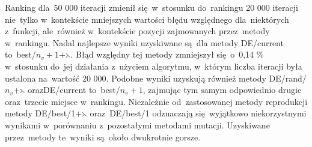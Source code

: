 \begin{itemize}
\begin{table}[h!]
\begin{center}
\caption{Ranking metod mutacji na podstawie średniej wartości błędu względnego funkcji celu, metoda rankingowa, 50 000 iteracji.}
\label{ranking4}
\end{center}
\end{table}

Ranking dla~50 000 iteracji zmienił się~w~stosunku do~rankingu 20 000 iteracji nie~tylko w~kontekście mniejszych wartości błędu względnego dla~niektórych z~funkcji, ale~również w~kontekście pozycji zajmowanych przez~metody w~rankingu. Nadal najlepsze wyniki uzyskiwane są~dla metody DE/current to~best/$n_{v}+1$+$\leftthreetimes$. Błąd względny tej metody zmniejszył się~o~0,14 \% w~stosunku do~jej działania z~użyciem algorytmu, w~którym liczba iteracji była ustalona na~wartość 20 000. Podobne wyniki uzyskują również metody DE/rand/$n_{v}$+$\leftthreetimes$ orazDE/current to~best/$n_{v}+1$, zajmując tym samym odpowiednio drugie oraz~trzecie miejsce w~rankingu. Niezależnie od~zastosowanej metody reprodukcji metody DE/best/1+$\leftthreetimes$ oraz~DE/best/1 odznaczają się~wyjątkowo niekorzystnymi wynikami w~porównaniu z~pozostałymi metodami mutacji. Uzyskiwane przez~metody te~wyniki są~około dwukrotnie gorsze.\\

\end{itemize}


